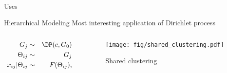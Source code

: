 \begin{frame}[t]{Uses}
\begin{block}{Hierarchical Modeling}
Most interesting application of Dirichlet process
\begin{columns}
\begin{column}{.5\textwidth}
\begin{eqnarray*}
G_j &\sim& \DP(c,G_0) \\
\Theta_{ij} &\sim& G_j \\
x_{ij} | \Theta_{ij} &\sim& F(\Theta_{ij}),
\end{eqnarray*} 
\vspace{2cm}
\end{column}
\begin{column}{.5\textwidth}
\begin{figure}[t]
\begin{center}
\texttt{[image: fig/shared\_clustering.pdf]}
\caption{Shared clustering}
\label{default}
\end{center}
\end{figure}

\end{column}
\end{columns}
\end{block}
\end{frame}	